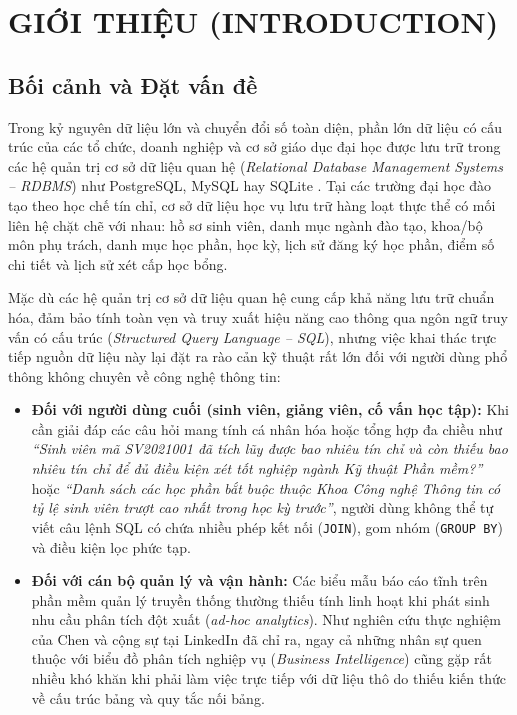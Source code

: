\documentclass[12pt,a4paper]{report}
\begin{document}
\chapter{GIỚI THIỆU (INTRODUCTION)}

\section{Bối cảnh và Đặt vấn đề}

Trong kỷ nguyên dữ liệu lớn và chuyển đổi số toàn diện, phần lớn dữ liệu có cấu trúc của các tổ chức, doanh nghiệp và cơ sở giáo dục đại học được lưu trữ trong các hệ quản trị cơ sở dữ liệu quan hệ (\textit{Relational Database Management Systems -- RDBMS}) như PostgreSQL, MySQL hay SQLite \cite{wang2025macsql, chen2025enterprise}. Tại các trường đại học đào tạo theo học chế tín chỉ, cơ sở dữ liệu học vụ lưu trữ hàng loạt thực thể có mối liên hệ chặt chẽ với nhau: hồ sơ sinh viên, danh mục ngành đào tạo, khoa/bộ môn phụ trách, danh mục học phần, học kỳ, lịch sử đăng ký học phần, điểm số chi tiết và lịch sử xét cấp học bổng.

Mặc dù các hệ quản trị cơ sở dữ liệu quan hệ cung cấp khả năng lưu trữ chuẩn hóa, đảm bảo tính toàn vẹn và truy xuất hiệu năng cao thông qua ngôn ngữ truy vấn có cấu trúc (\textit{Structured Query Language -- SQL}), nhưng việc khai thác trực tiếp nguồn dữ liệu này lại đặt ra rào cản kỹ thuật rất lớn đối với người dùng phổ thông không chuyên về công nghệ thông tin:
\begin{itemize}
    \item \textbf{Đối với người dùng cuối (sinh viên, giảng viên, cố vấn học tập):} Khi cần giải đáp các câu hỏi mang tính cá nhân hóa hoặc tổng hợp đa chiều như \textit{``Sinh viên mã SV2021001 đã tích lũy được bao nhiêu tín chỉ và còn thiếu bao nhiêu tín chỉ để đủ điều kiện xét tốt nghiệp ngành Kỹ thuật Phần mềm?''} hoặc \textit{``Danh sách các học phần bắt buộc thuộc Khoa Công nghệ Thông tin có tỷ lệ sinh viên trượt cao nhất trong học kỳ trước''}, người dùng không thể tự viết câu lệnh SQL có chứa nhiều phép kết nối (\texttt{JOIN}), gom nhóm (\texttt{GROUP BY}) và điều kiện lọc phức tạp.
    \item \textbf{Đối với cán bộ quản lý và vận hành:} Các biểu mẫu báo cáo tĩnh trên phần mềm quản lý truyền thống thường thiếu tính linh hoạt khi phát sinh nhu cầu phân tích đột xuất (\textit{ad-hoc analytics}). Như nghiên cứu thực nghiệm của Chen và cộng sự tại LinkedIn \cite{chen2025enterprise} đã chỉ ra, ngay cả những nhân sự quen thuộc với biểu đồ phân tích nghiệp vụ (\textit{Business Intelligence}) cũng gặp rất nhiều khó khăn khi phải làm việc trực tiếp với dữ liệu thô do thiếu kiến thức về cấu trúc bảng và quy tắc nối bảng.
\end{itemize}
\end{document}
